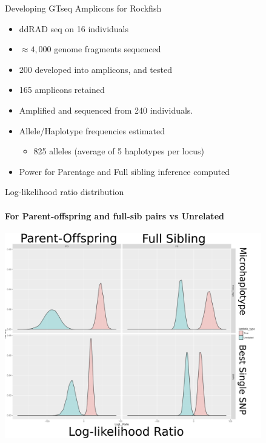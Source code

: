 \documentclass[letter,graphicx]{beamer}
\begin{document}
\begin{frame}{Developing GTseq Amplicons for Rockfish}
\begin{itemize}
\item ddRAD seq on 16 individuals 
\item $\approx 4,000$ genome fragments sequenced
\item 200 developed into amplicons, and tested
\item 165 amplicons retained
\item Amplified and sequenced from 240 individuals.
\item Allele/Haplotype frequencies estimated
\begin{itemize}
\item 825 alleles (average of 5 haplotypes per locus)
\end{itemize}

\item Power for Parentage and Full sibling inference computed
\end{itemize}

\end{frame}
















\begin{frame}{Log-likelihood ratio distribution}
\framesubtitle{For Parent-offspring and full-sib pairs vs Unrelated}
\begin{center}
\includegraphics[width = 0.84\textwidth]{mhap_figs/loglrats.pdf}
\end{center}

\end{frame}
\end{document}
